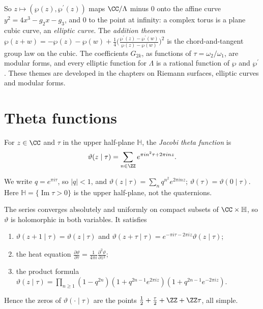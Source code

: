 \begin{remark}\label{special-functions:remark-elliptic-curves}
So $z \mapsto (\wp(z), \wp^{\prime}(z))$ maps $\CC/\Lambda$ minus $0$ onto the affine curve $y^2 = 4x^3 - g_2x - g_3$, and $0$ to the point at infinity: a complex torus is a plane cubic curve, an \emph{elliptic curve}. The
\emph{addition theorem} $\wp(z + w) = -\wp(z) - \wp(w) + \frac14\bigl(\frac{\wp^{\prime}(z) - \wp^{\prime}(w)}{\wp(z) - \wp(w)}\bigr)^2$ is the chord-and-tangent group law on the cubic. The coefficients $G_{2k}$, as functions of
$\tau = \omega_2/\omega_1$, are modular forms, and every elliptic function for $\Lambda$ is a rational function of $\wp$ and $\wp^{\prime}$. These themes are developed in the chapters on Riemann surfaces, elliptic curves and
modular forms.
\end{remark}

\section{Theta functions}\label{special-functions:section-theta}

\begin{definition}\label{special-functions:definition-theta}
For $z \in \CC$ and $\tau$ in the upper half-plane $\mathbb{H}$, the \emph{Jacobi theta function} is
\[
\vartheta(z \mid \tau) = \sum_{n \in \ZZ}e^{\pi in^2\tau + 2\pi inz}.
\]
\end{definition}

\begin{notation}\label{special-functions:notation-theta}
We write $q = e^{\pi i\tau}$, so $|q| < 1$, and $\vartheta(z \mid \tau) = \sum_nq^{n^2}e^{2\pi inz}$; $\vartheta(\tau) = \vartheta(0 \mid \tau)$. Here $\mathbb{H} = \{\operatorname{Im}\tau > 0\}$ is the upper half-plane, not the
quaternions.
\end{notation}

\begin{proposition}\label{special-functions:proposition-theta-basic}
The series converges absolutely and uniformly on compact subsets of $\CC \times \mathbb{H}$, so $\vartheta$ is holomorphic in both variables. It satisfies
\begin{enumerate}
\item $\vartheta(z + 1 \mid \tau) = \vartheta(z \mid \tau)$ and $\vartheta(z + \tau \mid \tau) = e^{-\pi i\tau - 2\pi iz}\vartheta(z \mid \tau)$;
\item the heat equation $\frac{\partial\vartheta}{\partial\tau} = \frac{1}{4\pi i}\frac{\partial^2\vartheta}{\partial z^2}$;
\item the product formula $\vartheta(z \mid \tau) = \prod_{n \geq 1}(1 - q^{2n})(1 + q^{2n-1}e^{2\pi iz})(1 + q^{2n-1}e^{-2\pi iz})$.
\end{enumerate}
Hence the zeros of $\vartheta(\cdot \mid \tau)$ are the points $\frac12 + \frac\tau2 + \ZZ + \ZZ\tau$, all simple.
\end{proposition}

